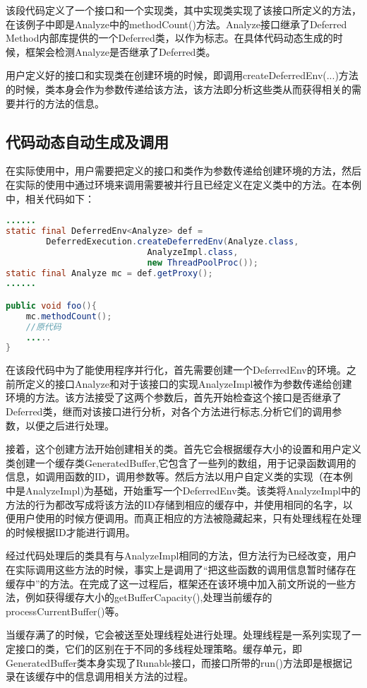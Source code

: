 该段代码定义了一个接口和一个实现类，其中实现类实现了该接口所定义的方法，在该例子中即是Analyze中的methodCount()方法。Analyze接口继承了Deferred Method内部库提供的一个Deferred类，以作为标志。在具体代码动态生成的时候，框架会检测Analyze是否继承了Deferred类。

用户定义好的接口和实现类在创建环境的时候，即调用createDeferredEnv(...)方法的时候，类本身会作为参数传递给该方法，该方法即分析这些类从而获得相关的需要并行的方法的信息。

\subsection{代码动态自动生成及调用}

在实际使用中，用户需要把定义的接口和类作为参数传递给创建环境的方法，然后在实际的使用中通过环境来调用需要被并行且已经定义在定义类中的方法。在本例中，相关代码如下：

\begin{lstlisting}[language=Java]
......
static final DeferredEnv<Analyze> def = 
		DeferredExecution.createDeferredEnv(Analyze.class, 
							AnalyzeImpl.class, 
							new ThreadPoolProc());
static final Analyze mc = def.getProxy();
......

public void foo(){
	mc.methodCount();
	//原代码
	.....
}
\end{lstlisting}

在该段代码中为了能使用程序并行化，首先需要创建一个DeferredEnv的环境。之前所定义的接口Analyze和对于该接口的实现AnalyzeImpl被作为参数传递给创建环境的方法。该方法接受了这两个参数后，首先开始检查这个接口是否继承了Deferred类，继而对该接口进行分析，对各个方法进行标志,分析它们的调用参数，以便之后进行处理。

接着，这个创建方法开始创建相关的类。首先它会根据缓存大小的设置和用户定义类创建一个缓存类GeneratedBuffer,它包含了一些列的数组，用于记录函数调用的信息，如调用函数的ID，调用参数等。然后方法以用户自定义类的实现（在本例中是AnalyzeImpl)为基础，开始重写一个DeferredEnv类。该类将AnalyzeImpl中的方法的行为都改写成将该方法的ID存储到相应的缓存中，并使用相同的名字，以便用户使用的时候方便调用。而真正相应的方法被隐藏起来，只有处理线程在处理的时候根据ID才能进行调用。

经过代码处理后的类具有与AnalyzeImpl相同的方法，但方法行为已经改变，用户在实际调用这些方法的时候，事实上是调用了“把这些函数的调用信息暂时储存在缓存中”的方法。在完成了这一过程后，框架还在该环境中加入前文所说的一些方法，例如获得缓存大小的getBufferCapacity(),处理当前缓存的processCurrentBuffer()等。

当缓存满了的时候，它会被送至处理线程处进行处理。处理线程是一系列实现了一定接口的类，它们的区别在于不同的多线程处理策略。缓存单元，即GeneratedBuffer类本身实现了Runable接口，而接口所带的run()方法即是根据记录在该缓存中的信息调用相关方法的过程。

